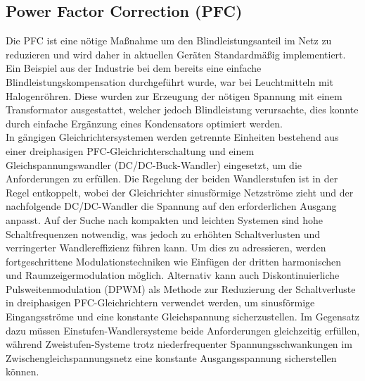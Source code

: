 		\subsection{Power Factor Correction (PFC)}
			Die \gls{PFC} ist eine nötige Maßnahme um den Blindleistungsanteil im Netz zu reduzieren und wird daher in aktuellen Geräten Standardmäßig implementiert. Ein Beispiel aus der Industrie bei dem bereits eine einfache Blindleistungskompensation durchgeführt wurde, war bei Leuchtmitteln mit Halogenröhren. Diese wurden zur Erzeugung der nötigen Spannung mit einem Transformator ausgestattet, welcher jedoch Blindleistung verursachte, dies konnte durch einfache Ergänzung eines Kondensators optimiert werden. \\
			In gängigen Gleichrichtersystemen werden getrennte Einheiten bestehend aus einer dreiphasigen PFC-Gleichrichterschaltung und einem Gleichspannungswandler (DC/DC-Buck-Wandler) eingesetzt, um die Anforderungen zu erfüllen. Die Regelung der beiden Wandlerstufen ist in der Regel entkoppelt, wobei der Gleichrichter sinusförmige Netzströme zieht und der nachfolgende DC/DC-Wandler die Spannung auf den erforderlichen Ausgang anpasst. Auf der Suche nach kompakten und leichten Systemen sind hohe Schaltfrequenzen notwendig, was jedoch zu erhöhten Schaltverlusten und verringerter Wandlereffizienz führen kann. Um dies zu adressieren, werden fortgeschrittene Modulationstechniken wie Einfügen der dritten harmonischen und Raumzeigermodulation möglich. Alternativ kann auch Diskontinuierliche Pulsweitenmodulation (DPWM) als Methode zur Reduzierung der Schaltverluste in dreiphasigen PFC-Gleichrichtern verwendet werden, um sinusförmige Eingangsströme und eine konstante Gleichspannung sicherzustellen. Im Gegensatz dazu müssen Einstufen-Wandlersysteme beide Anforderungen gleichzeitig erfüllen, während Zweistufen-Systeme trotz niederfrequenter Spannungsschwankungen im Zwischengleichspannungsnetz eine konstante Ausgangsspannung sicherstellen können.			
			
